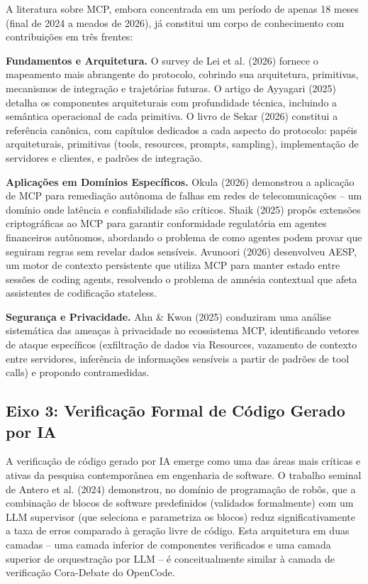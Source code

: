 \documentclass[12pt,a4paper,sumario=tradicional,openany]{abntex2}
\begin{document}
A literatura sobre MCP, embora concentrada em um período de apenas 18 meses (final de 2024 a meados de 2026), já constitui um corpo de conhecimento com contribuições em três frentes:

\textbf{Fundamentos e Arquitetura.} O survey de Lei et al. (2026) \cite{lei2026survey} fornece o mapeamento mais abrangente do protocolo, cobrindo sua arquitetura, primitivas, mecanismos de integração e trajetórias futuras. O artigo de Ayyagari (2025) \cite{ayyagari2025mcp} detalha os componentes arquiteturais com profundidade técnica, incluindo a semântica operacional de cada primitiva. O livro de Sekar (2026) \cite{sekarmcp2026} constitui a referência canônica, com capítulos dedicados a cada aspecto do protocolo: papéis arquiteturais, primitivas (tools, resources, prompts, sampling), implementação de servidores e clientes, e padrões de integração.

\textbf{Aplicações em Domínios Específicos.} Okula (2026) \cite{okula2026era} demonstrou a aplicação de MCP para remediação autônoma de falhas em redes de telecomunicações -- um domínio onde latência e confiabilidade são críticos. Shaik (2025) \cite{shaik2025cbi} propôs extensões criptográficas ao MCP para garantir conformidade regulatória em agentes financeiros autônomos, abordando o problema de como agentes podem provar que seguiram regras sem revelar dados sensíveis. Avunoori (2026) \cite{avunoori2026aesp} desenvolveu AESP, um motor de contexto persistente que utiliza MCP para manter estado entre sessões de coding agents, resolvendo o problema de amnésia contextual que afeta assistentes de codificação stateless.

\textbf{Segurança e Privacidade.} Ahn \& Kwon (2025) \cite{ahn2025privacy} conduziram uma análise sistemática das ameaças à privacidade no ecossistema MCP, identificando vetores de ataque específicos (exfiltração de dados via Resources, vazamento de contexto entre servidores, inferência de informações sensíveis a partir de padrões de tool calls) e propondo contramedidas.

\subsection{Eixo 3: Verificação Formal de Código Gerado por IA}

A verificação de código gerado por IA emerge como uma das áreas mais críticas e ativas da pesquisa contemporânea em engenharia de software. O trabalho seminal de Antero et al. (2024) \cite{antero2024harnessing} demonstrou, no domínio de programação de robôs, que a combinação de blocos de software predefinidos (validados formalmente) com um LLM supervisor (que seleciona e parametriza os blocos) reduz significativamente a taxa de erros comparado à geração livre de código. Esta arquitetura em duas camadas -- uma camada inferior de componentes verificados e uma camada superior de orquestração por LLM -- é conceitualmente similar à camada de verificação Cora-Debate do OpenCode.
\end{document}
